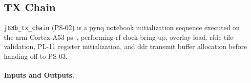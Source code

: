 
\subsection{TX Chain}
\label{subsec:ps_tx_chain}


\texttt{j83b\_tx\_chain} (PS-02) is a \ac{pynq} notebook
initialization sequence executed on the \ac{arm} Cortex-A53
\ac{ps}~\cite{PYNQ_DOC}, performing \ac{rf} clock bring-up,
overlay load, \ac{rfdc} tile validation, PL-11 register
initialization, and \ac{ddr} transmit buffer allocation before
handing off to PS-03.


\FloatBarrier
\paragraph{Inputs and Outputs.}
\leavevmode\par

